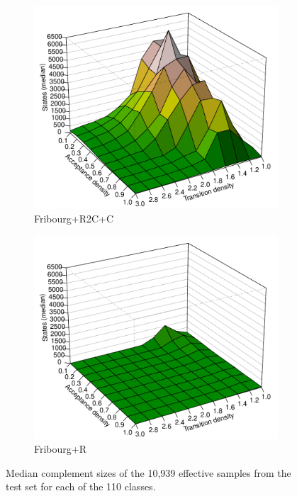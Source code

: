 \begin{figure}[ht]
  \hfill
  \begin{subfigure}[t]{\perspwidth\textwidth}
  \centering
  \includegraphics[width=\textwidth]{figures/r/internal/goal/s.median.Fribourg+R2C+C.pdf}
  \caption{Fribourg+R2C+C}
  \end{subfigure}
  \hfill
  \begin{subfigure}[t]{\perspwidth\textwidth}
  \centering
  \includegraphics[width=\textwidth]{figures/r/internal/goal/s.median.Fribourg+R.pdf}
  \caption{Fribourg+R}
  \end{subfigure}
  \hfill  
\caption{Median complement sizes of the 10,939 effective samples from the \goal{} test set for each of the 110 classes.}
\label{i.g.persp_1}
\end{figure}

